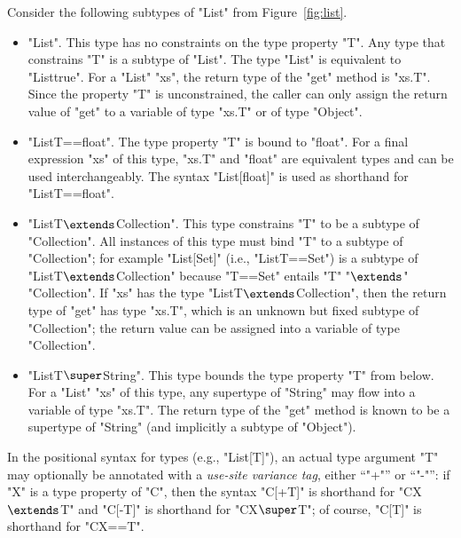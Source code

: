 Consider the following subtypes  of \xcd"List" from
Figure~\ref{fig:list}.
\begin{itemize}
\item \xcd"List".  This type has no constraints on the type
property \xcd"T".
Any type that constrains \xcd"T"
is a subtype of \xcd"List".  The type \xcd"List" is equivalent to
\xcd"List{true}".
%
For a \xcd"List" \xcd"xs", the return type of the \xcd"get" method
is \xcd"xs.T".
Since the property \xcd"T" is unconstrained,
the caller can only assign the return value of \xcd"get"
to a variable of type \xcd"xs.T" or of type \xcd"Object".

\item \xcd"List{T==float}".
The type property \xcd"T" is bound to \xcd"float".
For a final expression \xcd"xs" of this type,
\xcd"xs.T" and \xcd"float" are equivalent types and can be used
interchangeably.
The syntax \xcd"List[float]" is used as
shorthand for \xcd"List{T==float}".

\item \xcdmath"List{T$\extends$Collection}".
This type constrains \xcd"T" to be a subtype of \xcd"Collection".
All instances of this type must bind \xcd"T" to a subtype of
\xcd"Collection"; for example \xcd"List[Set]" (i.e.,
\xcd"List{T==Set}") is a subtype of
\xcdmath"List{T$\extends$Collection}" because \xcd"T==Set" entails
\xcdmath"T"
\xcdmath"$\extends$"
\xcdmath"Collection".
%
If \xcd"xs" has the type \xcdmath"List{T$\extends$Collection}",
then the return type of \xcd"get" has type \xcd"xs.T", which is an unknown but
fixed subtype of \xcd"Collection"; the return value can be
assigned into a variable of type \xcd"Collection".

\item \xcdmath"List{T$\super$String}".  This type bounds the type property
\xcd"T"
from below.  For a \xcd"List" \xcd"xs" of this type, any
supertype of \xcd"String" may flow into a variable of type \xcd"xs.T".
The return type of the \xcd"get"
method is known to be a
supertype of \xcd"String" (and implicitly a subtype of \xcd"Object").
\end{itemize}

In the positional syntax for types (e.g., \xcd"List[T]"),
an actual type argument \xcd"T" may optionally
be annotated
with
a \emph{use-site variance tag}, either ``\xcd"+"'' or ``\xcd"-"'':
if \xcd"X" is a type property of \xcd"C", then
the syntax \xcd"C[+T]" is shorthand for \xcdmath"C{X$\extends$T}" and
\xcd"C[-T]" is shorthand for \xcdmath"C{X$\super$T}"; of course,
\xcd"C[T]" is shorthand for \xcd"C{X==T}".



